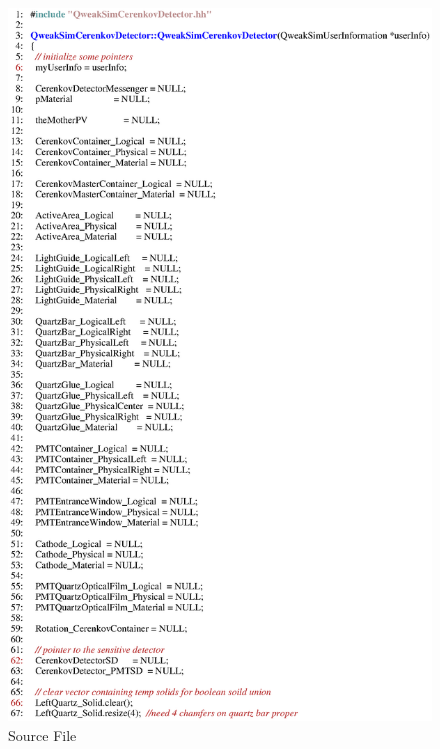 \begin{figure}[ht]
  \hspace{0cm}
  \includegraphics[scale=0.8]{./figures5/QweakSimCerenkovDetector.cc-p1.eps}
  \caption{Source File}
           \label{fig:V-SC-5}
\end{figure}
\clearpage

